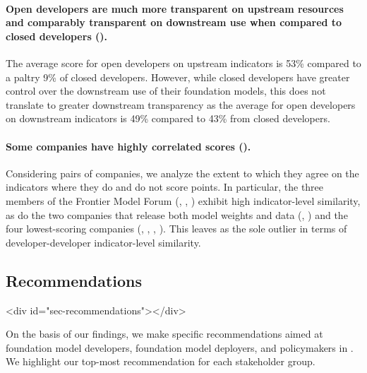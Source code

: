 \documentclass[screen, authorversion, acmsmall]{acmart}
\begin{document}
\paragraph{Open developers are much more transparent on upstream resources and comparably transparent on downstream use when compared to closed developers ().}
The average score for open developers on upstream indicators is 53\% compared to a paltry 9\% of closed developers.
However, while closed developers have greater control over the downstream use of their foundation models, this does not translate to greater downstream transparency as the average for open developers on downstream indicators is 49\% compared to 43\% from closed developers.

\paragraph{Some companies have highly correlated scores ().}
Considering pairs of companies, we analyze the extent to which they agree on the indicators where they do and do not score points.
In particular, the three members of the Frontier Model Forum (\anthropic, \google, \openai) exhibit high indicator-level similarity, as do the two companies that release both model weights and data (\huggingface, \stability) and the four lowest-scoring companies (\cohere, \aitwentyone, \inflection, \amazon).
This leaves \meta as the sole outlier in terms of developer-developer indicator-level similarity.
\clearpage










\hypertarget{recommendations}{\subsection{Recommendations}}
<div id="sec-recommendations"></div>


On the basis of our findings, we make specific recommendations aimed at foundation model developers, foundation model deployers, and policymakers in . 
We highlight our top-most recommendation for each stakeholder group.
\end{document}
